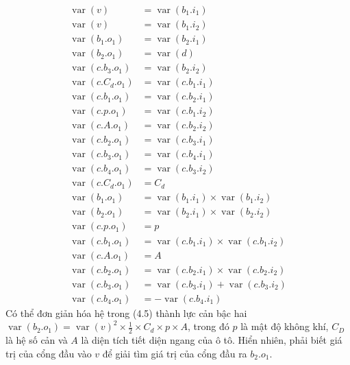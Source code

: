 \begin{equation}\begin{aligned}
\operatorname{var}(v)&=\operatorname{var}(b_1.i_1)\\
\operatorname{var}(v)&=\operatorname{var}(b_1.i_2)\\
\operatorname{var}(b_1.o_1)&=\operatorname{var}(b_2.i_1)\\
\operatorname{var}(b_2.o_1)&=\operatorname{var}(d)\\
\operatorname{var}(c.b_3.o_1)&=\operatorname{var}(b_2.i_2)\\
\operatorname{var}(c.C_d.o_1)&=\operatorname{var}(c.b_1.i_1)\\
\operatorname{var}(c.b_1.o_1)&=\operatorname{var}(c.b_2.i_1)\\
\operatorname{var}(c.p.o_1)&=\operatorname{var}(c.b_1.i_2)\\
\operatorname{var}(c.A.o_1)&=\operatorname{var}(c.b_2.i_2)\\
\operatorname{var}(c.b_2.o_1)&=\operatorname{var}(c.b_3.i_1)\\
\operatorname{var}(c.b_3.o_1)&=\operatorname{var}(c.b_4.i_1)\\
\operatorname{var}(c.b_4.o_1)&=\operatorname{var}(c.b_3.i_2)\\
\operatorname{var}(c.C_d.o_1)&=C_d\\
\operatorname{var}(b_1.o_1)&=\operatorname{var}(b_1.i_1)\times\operatorname{var}(b_1.i_2)\\
\operatorname{var}(b_2.o_1)&=\operatorname{var}(b_2.i_1)\times\operatorname{var}(b_2.i_2)\\
\operatorname{var}(c.p.o_1)&=p\\
\operatorname{var}(c.b_1.o_1)&=\operatorname{var}(c.b_1.i_1)\times\operatorname{var}(c.b_1.i_2)\\
\operatorname{var}(c.A.o_1)&=A\\
\operatorname{var}(c.b_2.o_1)&=\operatorname{var}(c.b_2.i_1)\times\operatorname{var}(c.b_2.i_2)\\
\operatorname{var}(c.b_3.o_1)&=\operatorname{var}(c.b_3.i_1)+\operatorname{var}(c.b_3.i_2)\\
\operatorname{var}(c.b_4.o_1)&=-\operatorname{var}(c.b_4.i_1)
\end{aligned}\tag{4.5}\end{equation}
Có thể đơn giản hóa hệ trong (4.5) thành lực cản bậc hai $\operatorname{var}(b_2.o_1)=\operatorname{var}(v)^2\times\frac12\times C_d\times p\times A$, trong đó $p$ là mật độ không khí, $C_D$ là hệ số cản và $A$ là diện tích tiết diện ngang của ô tô. Hiển nhiên, phải biết giá trị của cổng đầu vào $v$ để giải tìm giá trị của cổng đầu ra $b_2.o_1$.

